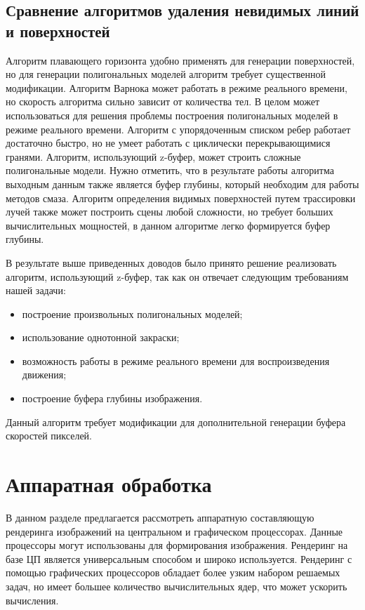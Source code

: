 \subsection{Сравнение алгоритмов удаления невидимых линий и поверхностей}

Алгоритм плавающего горизонта удобно применять для генерации поверхностей, но для генерации полигональных моделей алгоритм требует существенной модификации.
Алгоритм Варнока может работать в режиме реального времени, но скорость алгоритма сильно зависит от количества тел. В целом может использоваться для решения проблемы построения полигональных моделей в режиме реального времени.
Алгоритм с упорядоченным списком ребер работает достаточно быстро, но не умеет работать с циклически перекрывающимися гранями.
Алгоритм, использующий z-буфер, может строить сложные полигональные модели. Нужно отметить, что в результате работы алгоритма выходным данным также является буфер глубины, который необходим для работы методов смаза.
Алгоритм определения видимых поверхностей путем трассировки лучей также может построить сцены любой сложности, но требует больших вычислительных мощностей, в данном алгоритме легко формируется буфер глубины.
\par
В результате выше приведенных доводов было принято решение реализовать алгоритм, использующий z-буфер, так как он отвечает следующим  требованиям нашей задачи:
\begin{itemize}
    \item построение произвольных полигональных моделей;
    \item использование однотонной закраски;
    \item возможность работы в режиме реального времени для воспроизведения движения;
    \item построение буфера глубины изображения.
\end{itemize}


Данный алгоритм требует модификации для дополнительной генерации буфера скоростей пикселей.



\section{Аппаратная обработка}
В данном разделе предлагается рассмотреть аппаратную составляющую рендеринга изображений на центральном и графическом процессорах. Данные процессоры могут использованы для формирования изображения. Рендеринг на базе ЦП является универсальным способом и широко используется. Рендеринг с помощью графических процессоров обладает более узким набором решаемых задач, но имеет большее количество вычислительных ядер, что может ускорить вычисления. 


